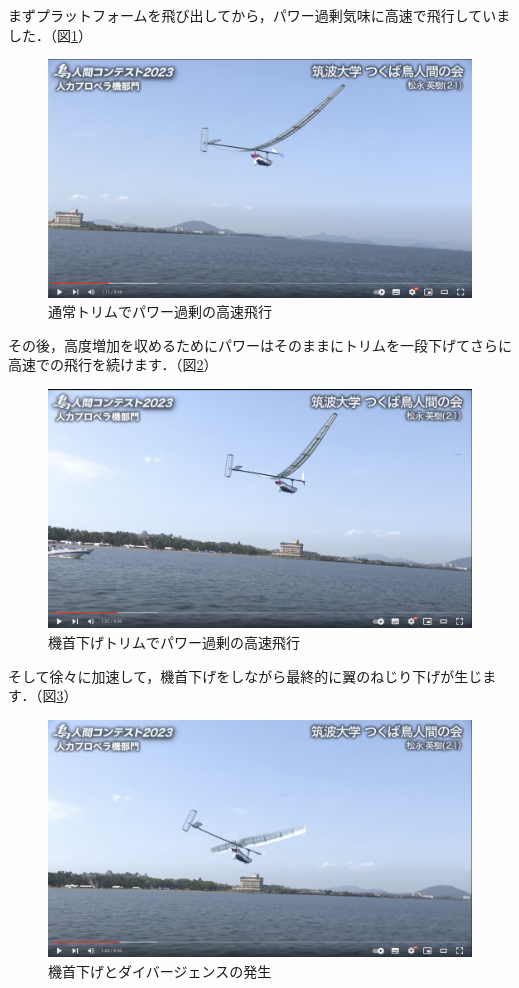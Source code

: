 \documentclass{jarticle}
\begin{document}
まずプラットフォームを飛び出してから，パワー過剰気味に高速で飛行していました．（図\ref{tsukuba1}）
\begin{figure}[H]
    \centering
    \includegraphics[width=0.7\linewidth]{image/tsukuba0111.png}
    \caption{通常トリムでパワー過剰の高速飛行}
    \label{tsukuba1}
\end{figure}
その後，高度増加を収めるためにパワーはそのままにトリムを一段下げてさらに高速での飛行を続けます．（図\ref{tsukuba2}）
\begin{figure}[H]
    \centering
    \includegraphics[width=0.7\linewidth]{image/tsukuba0122.png}
    \caption{機首下げトリムでパワー過剰の高速飛行}
    \label{tsukuba2}
\end{figure}
そして徐々に加速して，機首下げをしながら最終的に翼のねじり下げが生じます．（図\ref{tsukuba3}）
\begin{figure}[H]
    \centering
    \includegraphics[width=0.7\linewidth]{image/tsukuba0126.png}
    \caption{機首下げとダイバージェンスの発生}
    \label{tsukuba3}
\end{figure}
\end{document}
